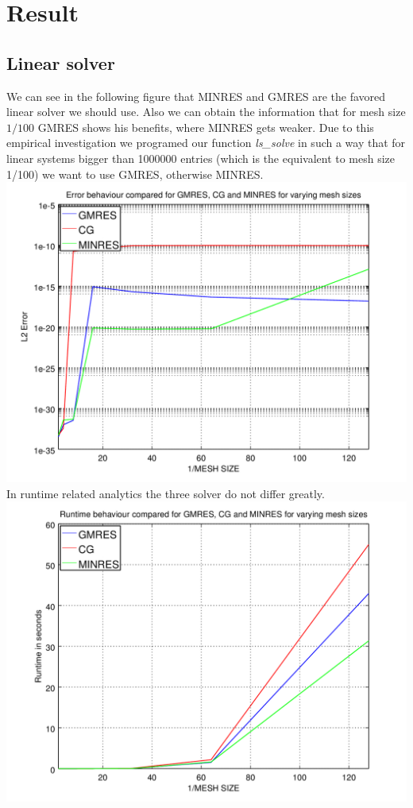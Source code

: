 \documentclass[a4paper,12pt]{report}
\begin{document}
\chapter[Results]{Result} 
\section{Linear solver}
We can see in the following figure that MINRES and GMRES are the favored linear solver we should use. Also we can obtain the information that for mesh size $1/100$ GMRES shows his benefits, where MINRES gets weaker. Due to this empirical investigation we programed our function \textit{ls\_solve} in such a way that for linear systems bigger than
1000000 entries (which is the equivalent to mesh size 1/100) we want to use GMRES, otherwise MINRES.
\\
\includegraphics[scale=0.7]{./linear_solver_error_behaviour} 
\newpage
In runtime related analytics the three solver do not differ greatly.  \\
\includegraphics[scale=0.7]{./linear_solver_runtime}
\newpage
\end{document}
